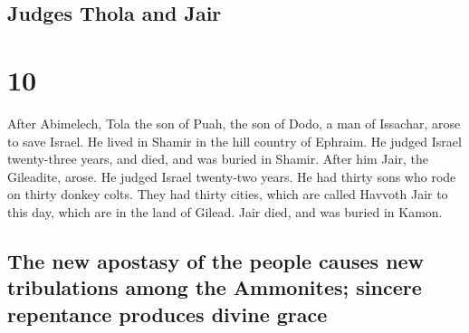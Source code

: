 \hypertarget{judges-thola-and-jair}{%
\subsection{Judges Thola and Jair}\label{judges-thola-and-jair}}

\hypertarget{section-9}{%
\section{10}\label{section-9}}

 After Abimelech, Tola the son of Puah, the son of Dodo, a
man of Issachar, arose to save Israel. He lived in Shamir in the hill
country of Ephraim.  He judged Israel twenty-three years,
and died, and was buried in Shamir.  After him Jair, the
Gileadite, arose. He judged Israel twenty-two years.  He
had thirty sons who rode on thirty donkey colts. They had thirty cities,
which are called Havvoth Jair to this day, which are in the land of
Gilead.  Jair died, and was buried in Kamon.

\hypertarget{the-new-apostasy-of-the-people-causes-new-tribulations-among-the-ammonites-sincere-repentance-produces-divine-grace}{%
\subsection{The new apostasy of the people causes new tribulations among
the Ammonites; sincere repentance produces divine
grace}\label{the-new-apostasy-of-the-people-causes-new-tribulations-among-the-ammonites-sincere-repentance-produces-divine-grace}}


